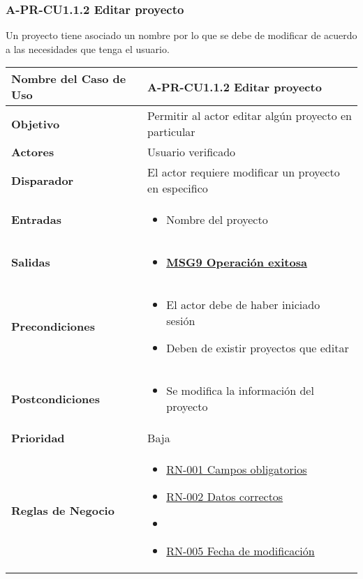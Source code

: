 \subsubsection{A-PR-CU1.1.2 Editar proyecto}
Un proyecto tiene asociado un nombre por lo que se debe de modificar de acuerdo a las necesidades que tenga el usuario.
\begin{longtable}{|J{5cm}|J{10.3cm}|}
	\hline
	\textbf{Nombre del Caso de Uso} &
		A-PR-CU1.1.2 Editar proyecto \\ \hline
	\textbf{Objetivo} &
		Permitir al actor editar algún proyecto en particular \\ \hline
	\textbf{Actores} &
		Usuario verificado \\ \hline 
	\textbf{Disparador} & 
		El actor requiere modificar un proyecto en especifico \\ \hline 
	\textbf{Entradas} & 
	    \begin{itemize}
	        \item Nombre del proyecto
	    \end{itemize} \\ \hline 
	\textbf{Salidas} & 
		\begin{itemize}
		    \item \hyperref[MSG9]{\bf MSG9 Operación exitosa}
		\end{itemize} \\ \hline
	\textbf{Precondiciones} &
		\begin{itemize}
				\item El actor debe de haber iniciado sesión
				\item Deben de existir proyectos que editar
		\end{itemize} \\ \hline
	\textbf{Postcondiciones} &
		\begin{itemize}
			\item Se modifica la información del proyecto
		\end{itemize}\\ \hline
	\textbf{Prioridad} & 
		Baja \\ \hline
	\textbf{Reglas de Negocio} & 
    	\begin{itemize}
    		\item \hyperref[RN001]{RN-001 Campos obligatorios}
    		\item \hyperref[RN002]{RN-002 Datos correctos}
    		\item \item \hyperref[RN005]{RN-005 Fecha de modificación}
    	\end{itemize}\\ \hline

\end{longtable}
